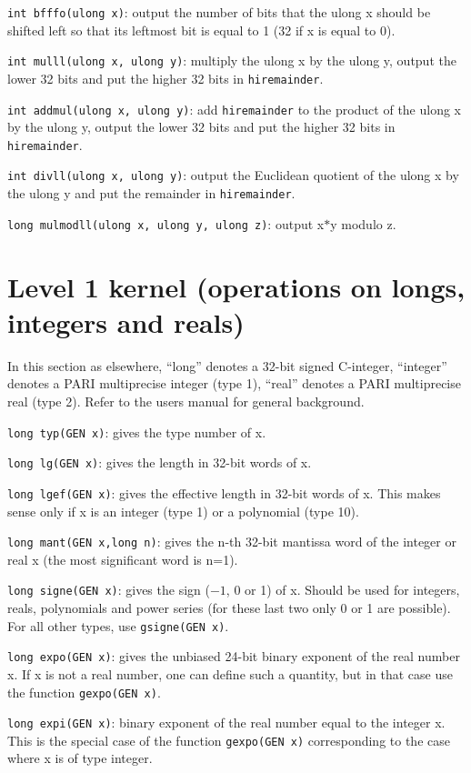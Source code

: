 {\tt int bfffo(ulong x)}: output the number of bits that the ulong x should
be shifted left so that its leftmost bit is equal to 1 (32 if x is equal to 0).

{\tt int mulll(ulong x, ulong y)}: multiply the ulong x by the ulong y, output
the lower 32 bits and put the higher 32 bits in {\tt hiremainder}.

{\tt int addmul(ulong x, ulong y)}: add {\tt hiremainder} to the product of
the ulong x by the ulong y, output the lower 32 bits and put the higher 32
bits in {\tt hiremainder}.

{\tt int divll(ulong x, ulong y)}: output the Euclidean quotient of the ulong
x by the ulong y and put the remainder in {\tt hiremainder}.

{\tt long mulmodll(ulong x, ulong y, ulong z)}: output x$*$y modulo z.

\section{Level 1 kernel (operations on longs, integers and reals)}
In this section as elsewhere, ``long'' denotes a 32-bit signed C-integer,
``integer'' denotes a PARI multiprecise integer (type 1), ``real'' denotes
a PARI multiprecise real (type 2). Refer to the users manual for general
background.


{\tt long typ(GEN x)}: gives the type number of x.

{\tt long lg(GEN x)}: gives the length in 32-bit words of x.

{\tt long lgef(GEN x)}: gives the effective length in 32-bit words of x. This
makes sense only if x is an integer (type 1) or a polynomial (type 10).

{\tt long mant(GEN x,long n)}: gives the n-th 32-bit mantissa word of the 
integer or real x (the most significant word is n=1).

{\tt long signe(GEN x)}: gives the sign ($-1$, 0 or 1) of x. Should be used
for integers, reals, polynomials and power series (for these last two only 0 
or 1 are possible). For all other types, use {\tt gsigne(GEN x)}.

{\tt long expo(GEN x)}: gives the unbiased 24-bit binary exponent of the real
number x. If x is not a real number, one can define such a quantity, but in
that case use the function {\tt gexpo(GEN x)}.

{\tt long expi(GEN x)}: binary exponent of the real number equal to the integer
x. This is the special case of the function {\tt gexpo(GEN x)} corresponding
to the case where x is of type integer.

